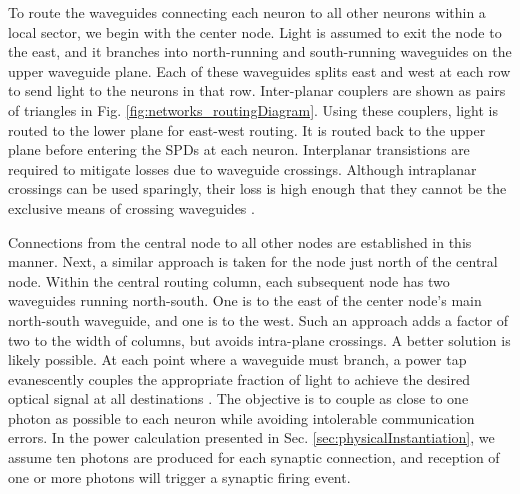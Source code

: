 \documentclass[aip,amsmath,amssymb,reprint,nofootinbib]{revtex4-1}
\begin{document}
To route the waveguides connecting each neuron to all other neurons within a local sector, we begin with the center node. Light is assumed to exit the node to the east, and it branches into north-running and south-running waveguides on the upper waveguide plane. Each of these waveguides splits east and west at each row to send light to the neurons in that row. Inter-planar couplers \cite{chbu2017} are shown as pairs of triangles in Fig. \ref{fig:networks_routingDiagram}. Using these couplers, light is routed to the lower plane for east-west routing. It is routed back to the upper plane before entering the SPDs at each neuron. Interplanar transistions are required to mitigate losses due to waveguide crossings. Although intraplanar crossings can be used sparingly, their loss is high enough that they cannot be the exclusive means of crossing waveguides \cite{lish2014}. 

Connections from the central node to all other nodes are established in this manner. Next, a similar approach is taken for the node just north of the central node. Within the central routing column, each subsequent node has two waveguides running north-south. One is to the east of the center node's main north-south waveguide, and one is to the west. Such an approach adds a factor of two to the width of columns, but avoids intra-plane crossings. A better solution is likely possible. At each point where a waveguide must branch, a power tap evanescently couples the appropriate fraction of light to achieve the desired optical signal at all destinations \cite{chbu2018}. The objective is to couple as close to one photon as possible to each neuron while avoiding intolerable communication errors. In the power calculation presented in Sec. \ref{sec:physicalInstantiation}, we assume ten photons are produced for each synaptic connection, and reception of one or more photons will trigger a synaptic firing event. 
\end{document}
